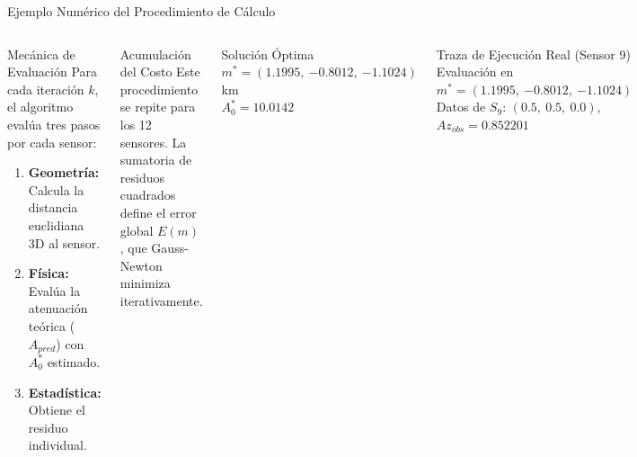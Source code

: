 
\begin{frame}{Ejemplo Numérico del Procedimiento de Cálculo}

    \begin{columns}[T]


        \begin{block}{Mecánica de Evaluación}
            \scriptsize
            Para cada iteración $k$, el algoritmo evalúa tres pasos por cada sensor:
            \begin{enumerate}
                \item \textbf{Geometría:} Calcula la distancia euclidiana 3D al sensor.
                \item \textbf{Física:} Evalúa la atenuación teórica ($A_{pred}$) con $A_0^*$ estimado.
                \item \textbf{Estadística:} Obtiene el residuo individual.
            \end{enumerate}
        \end{block}

        \vspace{0.1cm}

        \begin{block}{Acumulación del Costo}
            \scriptsize
            Este procedimiento se repite para los 12 sensores. La sumatoria de residuos cuadrados define el error global $E(m)$, que Gauss-Newton minimiza iterativamente.
        \end{block}

        \vspace{-0.10cm}

        \begin{exampleblock}{Solución Óptima}
            \centering
            \scriptsize
            $m^* = (1.1995,\ {-0.8012},\ {-1.1024})$ km \\
            $A_0^* = 10.0142$
        \end{exampleblock}


        \begin{exampleblock}{Traza de Ejecución Real (Sensor 9)}
            \tiny
            Evaluación en $m^* = (1.1995,\ {-0.8012},\ {-1.1024})$ \\
            Datos de $S_9$: $(0.5,\ 0.5,\ 0.0)$,\quad $Az_{obs} = 0.852201$


\end{exampleblock}
\end{columns}
\end{frame}
